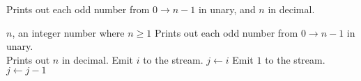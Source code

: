 \begin{algorithm}[h]
    \centering
    \small
    \caption{Prints out each odd number from $0\rightarrow n-1$ in
	unary, and $n$ in decimal.} 
    \begin{algorithmic}[1]
        \REQUIRE
	    $n$, an integer number where $n \geq 1$
	\ENSURE
	    Prints out each odd number from $0 \rightarrow n-1$ in unary.\\
	    Prints out $n$ in decimal.
		\PRINT Emit $i$ to the stream.
		\STATE
		\STATE
		     $j \leftarrow i$
		    \STATE
		    Emit $1$ to the stream.
		    \STATE
		    $j \leftarrow j - 1$
		\ENDWHILE				
		\STATE
	    \ENDIF
	\ENDFOR
    \end{algorithmic}
    \label{alg:EXAMPLE_ALG}
\end{algorithm}
